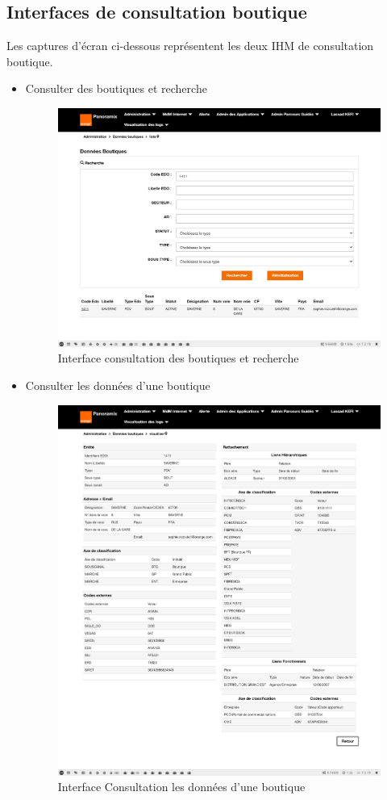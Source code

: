 \subsection{Interfaces de consultation boutique}
Les captures d'écran ci-dessous représentent les deux IHM de consultation boutique.
\begin{itemize}
	\item Consulter des boutiques et recherche
	\begin{figure}[H]
		\centering
		\includegraphics[width=0.5\linewidth]{img/screenshots/boutique/index}
		\caption[Interface consultation des boutiques et recherche]{Interface consultation des boutiques et recherche}
		\label{fig:index-btq}
	\end{figure}
	
	\item Consulter les données d'une boutique
	\begin{figure}[H]
		\centering
		\includegraphics[width=0.5\linewidth]{img/screenshots/boutique/view}
		\caption[Interface voir les données d'une boutique]{Interface Consultation les données d'une boutique}
		\label{fig:view-btq}
	\end{figure}
\end{itemize}

